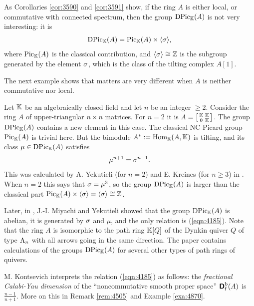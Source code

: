 As Corollaries \ref{cor:3590} and \ref{cor:3591} show, if the ring $A$ is 
either local, or commutative with connected spectrum, then the group 
$\operatorname{DPic}_{\mathbb{K}}(A)$ is not very interesting: it is 
\begin{equation} \label{4180}
\operatorname{DPic}_{\mathbb{K}}(A) = \operatorname{Pic}_{\mathbb{K}}(A) \times \langle \sigma \rangle , 
\end{equation}
where $\operatorname{Pic}_{\mathbb{K}}(A)$ is the classical contribution, and 
$\langle \sigma \rangle \cong \mathbb{Z}$ is the subgroup generated by the element $\sigma$, which is 
the class of the tilting complex $A[1]$.

The next example shows that matters are very different when $A$ is neither 
commutative nor local.

\begin{exa} \label{exa:4180}
Let $\mathbb{K}$ be an algebraically closed field and let $n$ be an integer $\geq 2$. 
Consider the ring $A$ of upper-triangular $n \times n$ matrices. For $n = 2$ it 
is $A = \left[ \begin{smallmatrix}  \mathbb{K} & \mathbb{K} \\[0.1em] 0 & \mathbb{K} \end{smallmatrix} \right]$.
The group $\operatorname{DPic}_{\mathbb{K}}(A)$ contains a new element in this case. 
The classical NC Picard group $\operatorname{Pic}_{\mathbb{K}}(A)$ is trivial here. But the 
bimodule $A^* := \operatorname{Hom}_{\mathbb{K}}(A, \mathbb{K})$
is tilting, and its class $\mu \in \operatorname{DPic}_{\mathbb{K}}(A)$ satisfies 
\begin{equation} \label{eqn:4185}
\mu^{n + 1} = \sigma^{n - 1} . 
\end{equation}
This was calculated by A. Yekutieli (for $n = 2$) and E. Kreines (for 
$n \geq 3$) in \cite{Ye4}. When $n = 2$ this says that 
$\sigma = \mu^3$, so the group $\operatorname{DPic}_{\mathbb{K}}(A)$ is larger than the classical 
part 
$\operatorname{Pic}_{\mathbb{K}}(A) \times \langle \sigma \rangle = \langle \sigma \rangle \cong \mathbb{Z}$.

Later, in \cite{MiYe}, J.-I. Miyachi and Yekutieli showed that the group 
$\operatorname{DPic}_{\mathbb{K}}(A)$ is abelian, it is generated by $\sigma$ and $\mu$, and the 
only relation is (\ref{eqn:4185}). Note that the ring $A$ is isomorphic to the 
path ring $\mathbb{K}[Q]$ of the Dynkin quiver $Q$ of type $\mathrm{A}_n$ with all
arrows going in the same direction. 
The paper \cite{MiYe} contains calculations 
of the groups $\operatorname{DPic}_{\mathbb{K}}(A)$ for several other types of path rings of 
quivers. 

M. Kontsevich interprets the relation (\ref{eqn:4185}) as follows: 
the {\em fractional Calabi-Yau dimension} of the ``noncommutative smooth proper 
space'' $\boldsymbol{\mathsf{D}}^{\mathrm{b}}_{\mathrm{f}}(A)$ is $\frac{n - 1}{n + 1}$. 
More on this in Remark \ref{rem:4505} and Example \ref{exa:4870}. 
\end{exa}

